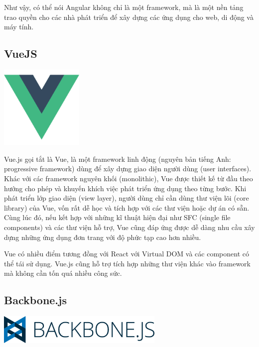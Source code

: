 Như vậy, có thể nói Angular không chỉ là một framework, mà là một nền tảng trao quyền cho các nhà phát triển để xây dựng các ứng dụng cho web, di động và máy tính.

\subsection{VueJS}
\begin{center}
  \captionsetup{type=figure}
  \includegraphics[width=4cm]{img/Vue-logo.png}
\end{center}

Vue.js gọi tắt là Vue, là một framework linh động (nguyên bản tiếng Anh: progressive framework) dùng để xây dựng giao diện người dùng (user interfaces). Khác với các framework nguyên khối (monolithic), Vue được thiết kế từ đầu theo hướng cho phép và khuyến khích việc phát triển ứng dụng theo từng bước. Khi phát triển lớp giao diện (view layer), người dùng chỉ cần dùng thư viện lõi (core library) của Vue, vốn rất dễ học và tích hợp với các thư viện hoặc dự án có sẵn. Cùng lúc đó, nếu kết hợp với những kĩ thuật hiện đại như SFC (single file components) và các thư viện hỗ trợ, Vue cũng đáp ứng được dễ dàng nhu cầu xây dựng những ứng dụng đơn trang với độ phức tạp cao hơn nhiều.

Vue có nhiều điểm tương đồng với React với Virtual DOM và các component có thể tái sử dụng. Vue.js cũng hỗ trợ tích hợp những thư viện khác vào framework mà không cần tốn quá nhiều công sức.
\subsection{Backbone.js}
\begin{center}
  \captionsetup{type=figure}
  \includegraphics[width=8cm]{img/backbone.png}
\end{center}

